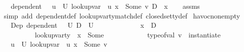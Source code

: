 \begin{isabellebody}
\ \ \ {\isachardoublequoteopen}dependent\ {\isasymLambda}\ {\isasymOmega}\ {\isacharbraceleft}{\kern0pt}u{\isacharprime}{\kern0pt}\ {\isasymin}\ U{\isachardot}{\kern0pt}\ lookup{\isacharunderscore}{\kern0pt}var\ {\isasymLambda}\ u{\isacharprime}{\kern0pt}\ x{}\ {\isacharequal}{\kern0pt}\ Some\ v{\isacharbraceright}{\kern0pt}\ {\isacharparenleft}{\kern0pt}D\ {\isasymunion}\ {\isacharbraceleft}{\kern0pt}x{}{\isacharbraceright}{\kern0pt}{\isacharparenright}{\kern0pt}{\isachardoublequoteclose}\isanewline
%
\isadelimproof
\ \ %
\endisadelimproof
%
\isatagproof
{}\isamarkupfalse%
\ assms\isanewline
\ \ \isamarkupfalse%
\ {\isacharparenleft}{\kern0pt}simp\ add{\isacharcolon}{\kern0pt}\ dependent{\isacharunderscore}{\kern0pt}def\ lookup{\isacharunderscore}{\kern0pt}var{\isacharunderscore}{\kern0pt}ty{\isacharunderscore}{\kern0pt}match{\isacharunderscore}{\kern0pt}def\ closed{\isacharunderscore}{\kern0pt}set{\isacharunderscore}{\kern0pt}ty{\isacharunderscore}{\kern0pt}def{\isacharparenright}{\kern0pt}%
\endisatagproof
{\isafoldproof}%
%
\isadelimproof
\isanewline
%
\endisadelimproof
\isanewline
{}\isamarkupfalse%
\ havoc{\isacharunderscore}{\kern0pt}non{\isacharunderscore}{\kern0pt}empty{\isacharcolon}{\kern0pt}\isanewline
\ \ \ Dep{\isacharcolon}{\kern0pt}\ {\isachardoublequoteopen}dependent\ {\isasymLambda}\ {\isasymOmega}\ U\ D{\isachardoublequoteclose}\ \ {\isachardoublequoteopen}U\ {\isasymnoteq}\ {\isacharbraceleft}{\kern0pt}{\isacharbraceright}{\kern0pt}{\isachardoublequoteclose}\ \isanewline
\ \ \ \ \ \ \ \ \ \ {\isachardoublequoteopen}x{}\ {\isasymnotin}\ D{\isachardoublequoteclose}\ \isanewline
\ \ \ \ \ \ \ \ \ \ {\isachardoublequoteopen}lookup{\isacharunderscore}{\kern0pt}var{\isacharunderscore}{\kern0pt}ty\ {\isasymLambda}\ x{}\ {\isacharequal}{\kern0pt}\ Some\ {\isasymtau}{\isachardoublequoteclose}\ \isanewline
\ \ \ \ \ \ \ \ \ \ {\isachardoublequoteopen}type{\isacharunderscore}{\kern0pt}of{\isacharunderscore}{\kern0pt}val\ v\ {\isacharequal}{\kern0pt}\ instantiate\ {\isasymOmega}\ {\isasymtau}{\isachardoublequoteclose}\isanewline
\ \ \ {\isachardoublequoteopen}{\isacharbraceleft}{\kern0pt}u{\isacharprime}{\kern0pt}\ {\isasymin}\ U{\isachardot}{\kern0pt}\ lookup{\isacharunderscore}{\kern0pt}var\ {\isasymLambda}\ u{\isacharprime}{\kern0pt}\ x{}\ {\isacharequal}{\kern0pt}\ Some\ v{\isacharbraceright}{\kern0pt}\ {\isasymnoteq}\ {\isacharbraceleft}{\kern0pt}{\isacharbraceright}{\kern0pt}{\isachardoublequoteclose}\isanewline

\end{isabellebody}
